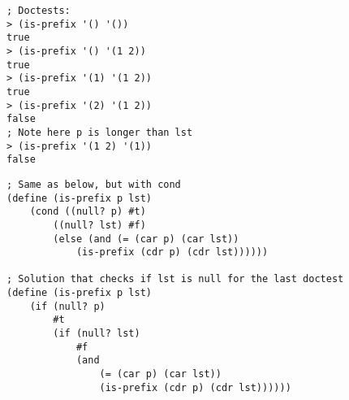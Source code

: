 \documentclass{exam}
\begin{document}
\begin{questions}
\begin{blocksection}
\begin{lstlisting}
; Doctests:
> (is-prefix '() '())
true
> (is-prefix '() '(1 2))
true
> (is-prefix '(1) '(1 2))
true
> (is-prefix '(2) '(1 2))
false
; Note here p is longer than lst
> (is-prefix '(1 2) '(1))
false
\end{lstlisting}

\begin{solution}[0.5in]
\begin{lstlisting}
; Same as below, but with cond
(define (is-prefix p lst)
    (cond ((null? p) #t)
        ((null? lst) #f)
        (else (and (= (car p) (car lst))
            (is-prefix (cdr p) (cdr lst))))))

; Solution that checks if lst is null for the last doctest
(define (is-prefix p lst)
    (if (null? p)
        #t
        (if (null? lst)
            #f
            (and
                (= (car p) (car lst))
                (is-prefix (cdr p) (cdr lst))))))
\end{lstlisting}
\end{solution}
\end{blocksection}

\end{questions}

\end{document}
